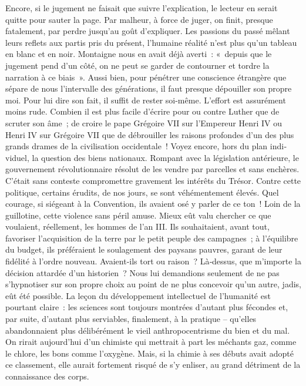 \documentclass[french,twoside]{book} %
\begin{document}
Encore, si le jugement ne faisait que suivre l’explication, le lecteur en serait quitte pour sauter la page. Par malheur, à force de juger, on finit, presque fatalement, par perdre jusqu’au goût d’expliquer. Les passions du passé mêlant leurs reflets aux partis pris du présent, l’humaine réalité n’est plus qu’un tableau en blanc et en noir. Montaigne nous en avait déjà averti : « depuis que le jugement pend d’un côté, on ne peut se garder de contourner et tordre la narration à ce biais ». Aussi bien, pour pénétrer une conscience étrangère que sépare de nous l’intervalle des générations, il faut presque dépouiller son propre moi. Pour lui dire son fait, il suffit de rester soi-même. L’effort est assurément moins rude. Combien il est plus facile d’écrire pour ou contre Luther que de scruter son âme ; de croire le pape Grégoire VII sur l’Empereur Henri IV ou Henri IV sur  
\label{p71} Grégoire VII que de débrouiller les raisons profondes d’un des plus grands drames de la civilisation occidentale ! Voyez encore, hors du plan indi­viduel, la question des biens nationaux. Rompant avec la législation antérieure, le gouvernement révolutionnaire résolut de les vendre par parcelles et sans enchères. C’était sans conteste compromettre gravement les intérêts du Trésor. Contre cette politique, certains érudits, de nos jours, se sont véhémentement élevés. Quel courage, si siégeant à la Con­vention, ils avaient osé y parler de ce ton ! Loin de la guillotine, cette violence sans péril amuse. Mieux eût valu chercher ce que voulaient, réellement, les hommes de l’an III. Ils souhaitaient, avant tout, favoriser l’acquisition de la terre par le petit peuple des campagnes ; à l’équilibre du budget, ils préféraient le soulagement des paysans pauvres, garant de leur fidélité à l’ordre nouveau. Avaient‑ils tort ou raison ? Là‑dessus, que m’importe la décision attardée d’un historien ? Nous lui demandions seulement de ne pas s’hypnotiser sur son propre choix au point de ne plus concevoir qu’un autre, jadis, eût été possible. La leçon du dévelop­pement intellectuel de l’humanité est pourtant claire : les sciences sont toujours montrées d’autant plus fécondes et, par suite, d’autant plus serviables, finalement, à la pratique – qu’elles abandonnaient plus délibérément le vieil anthropocentrisme du bien et du mal. On rirait aujourd’hui d’un chimiste qui mettrait à part les méchants gaz, comme le chlore, les bons comme l’oxygène. Mais, si la chimie à ses débuts avait adopté ce classement, elle aurait fortement risqué de s’y enliser, au grand détriment de la connaissance des corps.\par
\end{document}

